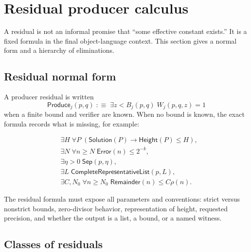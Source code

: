 \section{Residual producer calculus}
\label{sec:residuals}

A residual is not an informal promise that ``some effective constant exists.''
It is a fixed formula in the final object-language context.  This section gives
a normal form and a hierarchy of eliminations.

\subsection{Residual normal form}

A producer residual is written
\[
 \mathsf{Produce}_j(p,q)\;:\equiv\;
 \exists z<B_j(p,q)\;W_j(p,q,z)=1
\]
when a finite bound and verifier are known.  When no bound is known, the exact
formula records what is missing, for example:

\begin{align*}
&\exists H\;\forall P\;(
       \mathsf{Solution}(P)\to\mathsf{Height}(P)\le H),\\
&\exists N\;\forall n\ge N\;\mathsf{Error}(n)\le 2^{-k},\\
&\exists \eta>0\;\mathsf{Sep}(p,\eta),\\
&\exists L\;\mathsf{CompleteRepresentativeList}(p,L),\\
&\exists C,N_0\;\forall n\ge N_0\;\mathsf{Remainder}(n)\le C\rho(n).
\end{align*}

The residual formula must expose all parameters and conventions: strict versus
nonstrict bounds, zero-divisor behavior, representation of height, requested
precision, and whether the output is a list, a bound, or a named witness.

\subsection{Classes of residuals}

